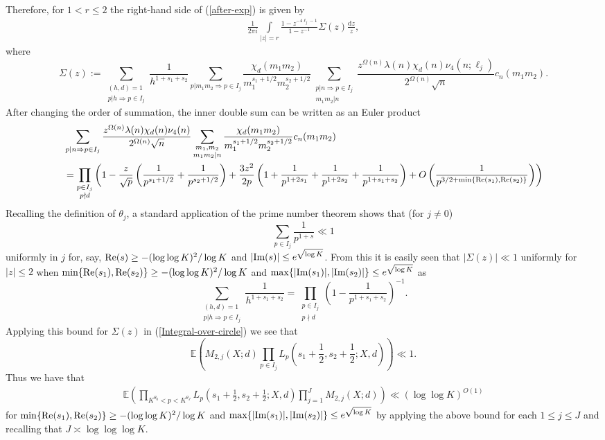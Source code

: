\documentclass[a4paper,10pt,twoside]{amsart}
\theoremstyle{definition}
\numberwithin{equation}{section}
\renewcommand{\Re}{\textnormal{Re}}
\renewcommand{\Im}{\textnormal{Im}}
\renewcommand\:{\colon}
\begin{document}
Therefore, for $1<r\leq 2$ the right-hand side of (\ref{after-exp}) is given by 
\begin{align}\label{Integral-over-circle}
\frac1{2\pi i}\int\limits_{|z|=r}\frac{1-z^{-4\ell_j-1}}{1-z^{-1}}\Sigma(z)\frac{\mathrm d z}z,
\end{align}
where 
\[ 
\Sigma(z):=\sum_{\substack{(h,d)=1\\
p|h\Rightarrow p\in I_j}}\frac1{h^{1+s_1+s_2}}\sum_{p|m_1m_2\Rightarrow p\in I_j}\frac{\chi_d(m_1m_2)}{m_1^{s_1+1/2}m_2^{s_2+1/2}}\sum_{\substack{p|n\Rightarrow p\in I_j\\
m_1m_2|n}}\frac{z^{\Omega(n)}\lambda(n)\chi_d(n)\nu_4(n;\ell_j)}{2^{\Omega(n)}\sqrt n}c_n(m_1m_2).
\]
After changing the order of summation, the inner double sum can be written as an Euler product
\begin{align*}
&\sum_{p|n\Rightarrow p\in I_j}\frac{z^{\Omega(n)}\lambda(n)\chi_d(n)\nu_4(n)}{2^{\Omega(n)}\sqrt n}\sum_{\substack{m_1,m_2\\
m_1m_2|n}}\frac{\chi_d(m_1m_2)}{m_1^{s_1+1/2}m_2^{s_2+1/2}}c_n(m_1m_2)\\
&=\prod_{\substack{p\in I_j\\
p\nmid d}}\left(1-\frac{z}{\sqrt p}\left(\frac1{p^{s_1+1/2}}+\frac1{p^{s_2+1/2}}\right)+\frac{3z^2}{2p}\left(1+\frac1{p^{1+2s_1}}+\frac1{p^{1+2s_2}}+\frac1{p^{1+s_1+s_2}}\right)+O\left(\frac1{p^{3/2+\min\{\Re(s_1),\Re(s_2)\}}}\right)\right)
\end{align*} 
Recalling the definition of $\theta_j$, a standard application of the prime number theorem shows that (for $j\neq 0$) 
\[ 
\sum_{p\in I_j}\frac1{p^{1+s}}\ll 1
\]
uniformly in $j$ for, say, $\Re(s)\geq -(\log\log K)^2/\log K$ and $|\Im(s)|\leq e^{\sqrt{\log K}}$. From this it is easily seen that $|\Sigma(z)|\ll 1$ uniformly for $|z|\leq 2$ when $\min\{\Re(s_1),\Re(s_2)\}\geq -(\log\log K)^2/\log K$ and $\max\{|\Im(s_1)|,|\Im(s_2)|\}\leq e^{\sqrt{\log K}}$ as
\[
\sum_{\substack{(h,d)=1\\
p|h\Rightarrow p\in I_j}}\frac1{h^{1+s_1+s_2}}=\prod_{\substack{p\in I_j\\
p\nmid d}}\left(1-\frac1{p^{1+s_1+s_2}}\right)^{-1}.
 \]
Applying this bound for $\Sigma(z)$ in (\ref{Integral-over-circle}) we see that 
\[ 
\mathbb E\left(M_{2,j}(X;d)\prod_{p\in I_j}L_p\left(s_1+\frac12,s_2+\frac12;X,d\right)\right)\ll 1.
\]
Thus we have that 
\begin{align}\label{loglog-bound}
\mathbb E\left(\prod_{K^{\theta_0}<p<K^{\theta_J}}L_p\left(s_1+\frac12,s_2+\frac12;X,d\right)\prod_{j=1}^J M_{2,j}(X;d)\right)\ll (\log\log K)^{O(1)}
\end{align}
for $\min\{\Re(s_1),\Re(s_2)\}\geq -(\log\log K)^2/\log K$ and $\max\{|\Im(s_1)|,|\Im(s_2)|\}\leq e^{\sqrt{\log K}}$ by applying the above bound for each $1\leq j\leq J$ and recalling that $J\asymp\log\log\log K$. 
\end{document}
